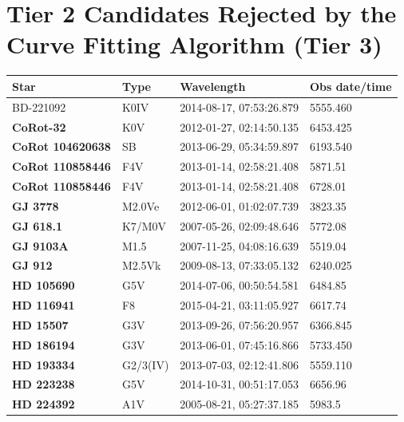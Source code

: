 \documentclass[linenumbers]{aastex701}
\providecommand{\DIFadd}[1]{{\bf #1}} %
\providecommand{\DIFaddbegin}{} %
\providecommand{\DIFaddend}{} %
\begin{document}
\clearpage
\DIFaddend 

\section{Tier 2 Candidates Rejected by the Curve Fitting Algorithm (Tier 3)}
\label{s:rejects}
 \begin{longtable}{|l|l|l|l|} 
\DIFaddbegin \label{t:tier3rejects} \\
 \DIFaddend \hline
 Star &  Type &  \DIFaddbegin \DIFadd{Wavelength }& \DIFadd{Obs date/time }\DIFaddend \\
 \hline
 BD-221092 & K0IV & 2014-08-17, 07:53:26.879 & 5555.460 \\
  \DIFaddbegin \DIFadd{CoRot-32 }\DIFaddend & K0V & 2012-01-27, 02:14:50.135 & 6453.425 \\
  \DIFaddbegin \DIFadd{CoRot  104620638 }\DIFaddend & SB & 2013-06-29, 05:34:59.897 & 6193.540 \\
  \DIFaddbegin \DIFadd{CoRot  110858446 }\DIFaddend & F4V & 2013-01-14, 02:58:21.408 & 5871.51 \\
  \DIFaddbegin \DIFadd{CoRot  110858446 }\DIFaddend & F4V & 2013-01-14, 02:58:21.408 & 6728.01  \\
  \DIFaddbegin \DIFadd{GJ 3778 }\DIFaddend & M2.0Ve & 2012-06-01, 01:02:07.739 & 3823.35  \\
  \DIFaddbegin \DIFadd{GJ 618.1 }\DIFaddend & K7/M0V & 2007-05-26, 02:09:48.646 & 5772.08  \\
  \DIFaddbegin \DIFadd{GJ 9103A }\DIFaddend & M1.5 & 2007-11-25, 04:08:16.639 & 5519.04  \\
  \DIFaddbegin \DIFadd{GJ 912 }\DIFaddend & M2.5Vk & 2009-08-13, 07:33:05.132 & 6240.025  \\
  \DIFaddbegin \DIFadd{HD 105690 }\DIFaddend & G5V & 2014-07-06, 00:50:54.581 & 6484.85 \\
  \DIFaddbegin \DIFadd{HD 116941 }\DIFaddend & F8 & 2015-04-21, 03:11:05.927 & 6617.74 \\
  \DIFaddbegin \DIFadd{HD 15507 }\DIFaddend & G3V & 2013-09-26, 07:56:20.957 & 6366.845 \\
  \DIFaddbegin \DIFadd{HD 186194 }\DIFaddend & G3V & 2013-06-01, 07:45:16.866 & 5733.450  \\
  \DIFaddbegin \DIFadd{HD 193334 }\DIFaddend & G2/3(IV) & 2013-07-03, 02:12:41.806 & 5559.110  \\
  \DIFaddbegin \DIFadd{HD 223238 }\DIFaddend & G5V & 2014-10-31, 00:51:17.053 & 6656.96  \\
  \DIFaddbegin \DIFadd{HD 224392 }\DIFaddend & A1V & 2005-08-21, 05:27:37.185 & 5983.5  \\

\end{longtable}
\end{document}
